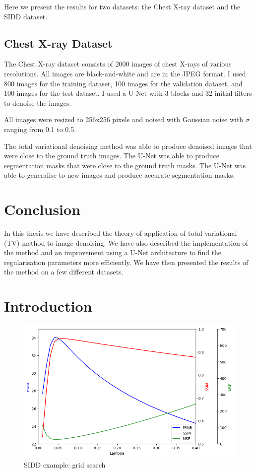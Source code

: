 \documentclass[12pt]{article}
\begin{document}
Here we present the results for two datasets: the Chest X-ray dataset and the SIDD dataset.

\subsection{Chest X-ray Dataset}

The Chest X-ray dataset consists of 2000 images of chest X-rays of various resolutions. 
All images are black-and-white and are in the JPEG format.
I used 800 images for the training dataset, 100 images for the validation dataset, and 100 images for the test dataset.
I used a U-Net with 3 blocks and 32 initial filters to denoise the images.

All images were resized to 256x256 pixels and noised with Gaussian noise with $\sigma$ ranging from 0.1 to 0.5.

The total variational denoising method was able to produce denoised images that were close to the ground truth images.
The U-Net was able to produce segmentation masks that were close to the ground truth masks.
The U-Net was able to generalise to new images and produce accurate segmentation masks.

\section{Conclusion}

In this thesis we have described the theory of application of total variational (TV) method to image denoising.
We have also described the implementation of the method and an improvement using a U-Net architecture to find the regularisation parameters more efficiently.
We have then presented the results of the method on a few different datasets.



\section{Introduction}





\begin{figure}[h]
    \centering
    \includegraphics[width=0.8\linewidth]{100-line_plots.png}
    \caption{SIDD example: grid search}
    \label{fig:enter-label}
\end{figure}
\end{document}
